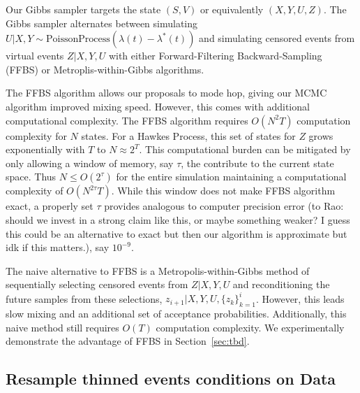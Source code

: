 \documentclass[11pt]{article}
\newcommand{\algrule}[1][.2pt]{\par\vskip.5\baselineskip\hrule height #1\par\vskip.5\baselineskip}
\begin{document}
Our Gibbs sampler targets the state $(S,V)$ or equivalently $(X,Y,U,Z)$. The Gibbs sampler alternates between simulating $U|X,Y \sim \text{PoissonProcess}(\lambda(t) - \lambda^*(t))$ and simulating censored events from virtual events $Z|X,Y,U$ with either Forward-Filtering Backward-Sampling (FFBS) or Metroplis-within-Gibbs algorithms. 


The FFBS algorithm allows our proposals to mode hop, giving our MCMC algorithm improved mixing speed. However, this comes with additional computational complexity. The FFBS algorithm requires $O(N^2T)$ computation complexity for $N$ states. For a Hawkes Process, this set of states for $Z$ grows exponentially with $T$ to $N \approx 2^T$. This computational burden can be mitigated by only allowing a window of memory, say $\tau$, the contribute to the current state space. Thus $N \leq O(2^\tau)$ for the entire simulation maintaining a computational complexity of $O(N^{2\tau} T)$. While this window does not make FFBS algorithm exact, a properly set $\tau$ provides analogous to computer precision error (to Rao: should we invest in a strong claim like this, or maybe something weaker? I guess this could be an alternative to exact but then our algorithm is approximate but idk if this matters.), say $10^{-9}$.


The naive alternative to FFBS is a Metropolis-within-Gibbs method of sequentially selecting censored events from $Z|X,Y,U$ and reconditioning the future samples from these selections, $z_{i+1} | X,Y,U,\{z_k\}_{k=1}^i$. However, this leads slow mixing and an additional set of acceptance probabilities. Additionally, this naive method still requires $O(T)$ computation complexity. We experimentally demonstrate the advantage of FFBS in Section~\ref{sec:tbd}.




\subsection{Resample thinned events conditions on Data}
\end{document}
